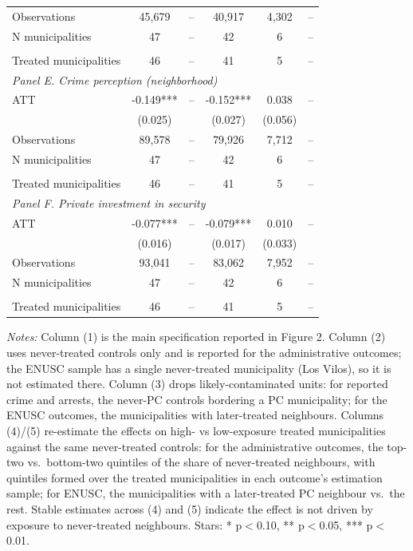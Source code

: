 \begin{table}[H]
\begin{tabular}{l*{5}{c}}
Observations & 45,679 & -- & 40,917 & 4,302 & -- \\
N municipalities & 47 & -- & 42 & 6 & -- \\\\
Treated municipalities & 46 & -- & 41 & 5 & -- \\
\midrule
\multicolumn{6}{l}{\textit{Panel E. Crime perception (neighborhood)}} \\
ATT & -0.149*** & -- & -0.152*** & 0.038 & -- \\
  & (0.025) &  & (0.027) & (0.056) &  \\
Observations & 89,578 & -- & 79,926 & 7,712 & -- \\
N municipalities & 47 & -- & 42 & 6 & -- \\\\
Treated municipalities & 46 & -- & 41 & 5 & -- \\
\midrule
\multicolumn{6}{l}{\textit{Panel F. Private investment in security}} \\
ATT & -0.077*** & -- & -0.079*** & 0.010 & -- \\
  & (0.016) &  & (0.017) & (0.033) &  \\
Observations & 93,041 & -- & 83,062 & 7,952 & -- \\
N municipalities & 47 & -- & 42 & 6 & -- \\\\
Treated municipalities & 46 & -- & 41 & 5 & -- \\
\bottomrule
\end{tabular}
\begin{minipage}{\textwidth}\footnotesize\vspace{4pt}
\textit{Notes:} Column (1) is the main specification reported in Figure 2. 
Column (2) uses never-treated controls only and is reported for the administrative outcomes; the ENUSC sample has a single never-treated municipality (Los Vilos), so it is not estimated there. 
Column (3) drops likely-contaminated units: for reported crime and arrests, the never-PC controls bordering a PC municipality; for the ENUSC outcomes, the municipalities with later-treated neighbours. 
Columns (4)/(5) re-estimate the effects on high- vs low-exposure treated municipalities against the same never-treated controls: for the administrative outcomes, the top-two vs.\ bottom-two quintiles of the share of never-treated neighbours, with quintiles formed over the treated municipalities in each outcome's estimation sample; for ENUSC, the municipalities with a later-treated PC neighbour vs.\ the rest. Stable estimates across (4) and (5) indicate the effect is not driven by exposure to never-treated neighbours. 
Stars: * p$<$0.10, ** p$<$0.05, *** p$<$0.01.
\end{minipage}
\end{table}
